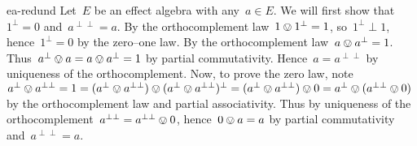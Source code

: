 \begin{solution}{ea-redund}%
Let~$E$ be an effect algebra with any~$a \in E$.
We will first show that~$1^\perp = 0$ and~$a^{\perp\perp} = a$.
By the orthocomplement law~$1 \ovee 1^\perp = 1$,
    so~$1^\perp \perp 1$,
    hence~$1^\perp=0$ by the zero--one law.
By the orthocomplement law~$a \ovee a^\perp = 1$.
Thus~$a^\perp \ovee a = a \ovee a^\perp = 1$ by partial commutativity.
    Hence~$a = a^{\perp\perp}$ by uniqueness of the orthocomplement.
Now, to prove the zero law,
    note~$a^\perp \ovee a^{\perp\perp}
        = 1 = (a^\perp\ovee a^{\perp\perp})
    \ovee (a^\perp \ovee a^{\perp\perp})^\perp
    = (a^\perp \ovee a^{\perp\perp}) \ovee 0 
        = a^\perp \ovee (a^{\perp\perp} \ovee 0)$
    by the orthocomplement law and partial associativity.
Thus by uniqueness of the orthocomplement~$a^{\perp\perp} = a^{\perp\perp} \ovee 0$,
    hence~$0 \ovee a = a$ by partial commutativity and~$a^{\perp\perp} = a$.
\end{solution}

